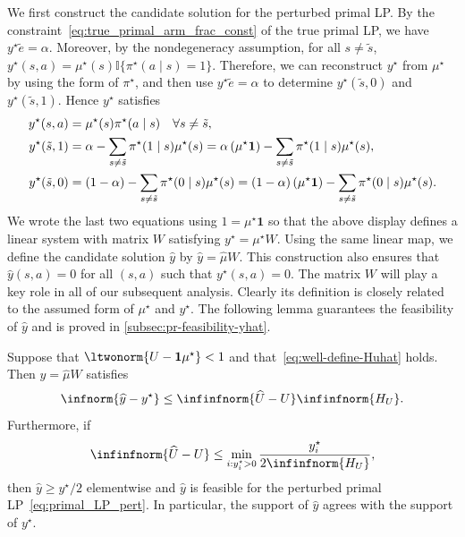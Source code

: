 \documentclass[mnsc,nonblindrev]{informs3}
\newcommand{\one}{\mathbf{1}}
\newcommand{\pistar}{\pi^\star}
\newcommand{\muhat}{\widehat{\mu}}
\newcommand{\uhat}{\widehat{U}}
\newcommand{\yhat}{\widehat{y}}
\begin{document}
We first construct the candidate solution for the perturbed primal LP. By
the constraint~\eqref{eq:true_primal_arm_frac_const} of the true primal LP,
we have \(y^\star\tilde e=\alpha\). Moreover, by the nondegeneracy
assumption, for all \(s\neq\tilde{s}\),
\(y^\star(s,a)=\mu^\star(s)\mathbb{I}\{\pistar(a\mid s)=1\}\). Therefore,
we can reconstruct \(y^\star\) from \(\mu^\star\) by using the form of
\(\pistar\), and then use \(y^\star\tilde e=\alpha\) to determine
\(y^\star(\tilde{s},0)\) and \(y^\star(\tilde{s},1)\). Hence \(y^\star\)
satisfies
\begin{align*}
    y^\star(s,a) &= \mu^\star(s) \pistar(a \mid s)  \quad \forall  s \neq \Tilde{s},  \\
    y^\star(\Tilde{s},1) &= \alpha -\sum_{s \neq \Tilde{s}} \pistar(1 \mid s) \mu^\star(s) =\alpha\left(\mu^\star \one \right) -\sum_{s \neq \Tilde{s}} \pistar(1 \mid s) \mu^\star(s),  \\
    y^\star(\Tilde{s},0) &= (1 - \alpha) - \sum_{s \neq \Tilde{s}} \pistar(0 \mid s) \mu^\star(s)  = (1 - \alpha)\left(\mu^\star \one \right) - \sum_{s \neq \Tilde{s}} \pistar(0 \mid s) \mu^\star(s).
\end{align*}
We wrote the last two equations using \(1=\mu^\star\one\) so that the
above display defines a linear system with matrix \(W\) satisfying
\(y^\star=\mu^\star W\). Using the same linear map, we define the candidate
solution \(\yhat\) by \(\yhat=\muhat W\). This construction also ensures
that \(\yhat(s,a)=0\) for all \((s,a)\) such that \(y^\star(s,a)=0\).
 The matrix $W$ will play a key role in all of our subsequent analysis. Clearly its definition is closely related to the assumed form of $\mu^\star$ and $y^\star$. 
The following lemma guarantees the feasibility of $\yhat$ and is proved in \ref{subsec:pr-feasibility-yhat}.
\begin{lemma}
\label{lem:main-perturbed-primal}
\label{lem:yhat_pert_and_feasibility}
Suppose that \(\ltwonorm{U-\one\mu^\star}<1\) and
that~\eqref{eq:well-define-Huhat} holds. Then \(\yhat=\muhat W\) satisfies
\begin{equation}
    \infnorm{\yhat-y^\star}
    \le
    \infinfnorm{\uhat-U}\infinfnorm{H_U}.
    \label{eq:yhat_pert_bound}
\end{equation}
Furthermore, if
\begin{equation}
    \infinfnorm{\uhat-U}
    \le
    \min_{i:y_i^\star>0}\frac{y_i^\star}{2\infinfnorm{H_U}},
    \label{eq:sc_pert_primal_feasibility}
\end{equation}
then \(\yhat\ge y^\star/2\) elementwise and \(\yhat\) is feasible for the
perturbed primal LP~\eqref{eq:primal_LP_pert}. In particular, the support
of \(\yhat\) agrees with the support of \(y^\star\).
\end{lemma}
\end{document}
